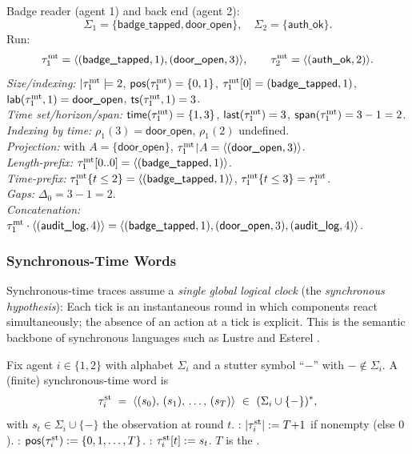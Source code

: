 \documentclass{article}
\begin{document}
  \begin{example}
  Badge reader (agent 1) and back end (agent 2):
  \[
  \Sigma_1=\{\textsf{badge\_tapped},\textsf{door\_open}\},\quad
  \Sigma_2=\{\textsf{auth\_ok}\}.
  \]
  Run:
  \[
  \tau^{\mathrm{mt}}_1=\langle (\textsf{badge\_tapped},1),(\textsf{door\_open},3) \rangle ,\qquad
  \tau^{\mathrm{mt}}_2=\langle (\textsf{auth\_ok},2) \rangle .
  \]
  \emph{Size/indexing:} \(|\tau^{\mathrm{mt}}_1|=2\),
  \(\mathsf{pos}(\tau^{\mathrm{mt}}_1)=\{0,1\}\),
  \(\tau^{\mathrm{mt}}_1[0]=(\textsf{badge\_tapped},1)\),
  \(\mathsf{lab}(\tau^{\mathrm{mt}}_1,1)=\textsf{door\_open}\),
  \(\mathsf{ts}(\tau^{\mathrm{mt}}_1,1)=3\).
  \\
  \emph{Time set/horizon/span:} \(\mathsf{time}(\tau^{\mathrm{mt}}_1)=\{1,3\}\),
  \(\mathsf{last}(\tau^{\mathrm{mt}}_1)=3\),
  \(\mathsf{span}(\tau^{\mathrm{mt}}_1)=3-1=2\).\\
  \emph{Indexing by time:} \(\rho_1(3)=\textsf{door\_open}\), \(\rho_1(2)\) undefined.\\
  \emph{Projection:} with \(A=\{\textsf{door\_open}\}\),
  \(\tau^{\mathrm{mt}}_1{\upharpoonright}A=\langle (\textsf{door\_open},3) \rangle \).\\
  \emph{Length-prefix:} \(\tau^{\mathrm{mt}}_1[0..0]=\langle (\textsf{badge\_tapped},1) \rangle \).\\
  \emph{Time-prefix:} \(\tau^{\mathrm{mt}}_1\{t\le 2\}=\langle (\textsf{badge\_tapped},1) \rangle \), \quad
  \(\tau^{\mathrm{mt}}_1\{t\le 3\}=\tau^{\mathrm{mt}}_1\).
  \\
  \emph{Gaps:} \(\Delta_0=3-1=2\).\\
  \emph{Concatenation:}
  \(\tau^{\mathrm{mt}}_1\cdot\langle (\textsf{audit\_log},4) \rangle 
  =\langle (\textsf{badge\_tapped},1),(\textsf{door\_open},3),(\textsf{audit\_log},4) \rangle \).
  \end{example}
  
  \subsubsection{Synchronous-Time Words}
  Synchronous-time traces assume a \emph{single global logical clock} (the \emph{synchronous hypothesis}):
  Each tick is an instantaneous round in which components react simultaneously; the absence of an action at a tick is explicit.
  This is the semantic backbone of synchronous languages such as Lustre and Esterel \cite{Halbwachs93}.
  
  \begin{definition}
  Fix agent \(i\in\{1,2\}\) with alphabet \(\Sigma_i\) and a stutter symbol “\(-\)” with \( -\notin\Sigma_i \).
  A (finite) synchronous-time word is
  \[
  \taust_i \;=\; \trace{(s_0),\,(s_1),\,\dots,\,(s_T)} \ \in\ (\Sigma_i\cup\{-\})^{*},
  \]
  with \(s_t\in\Sigma_i\cup\{-\}\) the observation at round \(t\).
  : \( |\tau^{\mathrm{st}}_i| := T{+}1 \) if nonempty (else \(0\)).
  : \( \mathsf{pos}(\tau^{\mathrm{st}}_i):=\{0,1,\dots,T\}\).
  : \( \tau^{\mathrm{st}}_i[t]:=s_t\).
  \(T\) is the .
  \end{definition}
  
\end{document}

